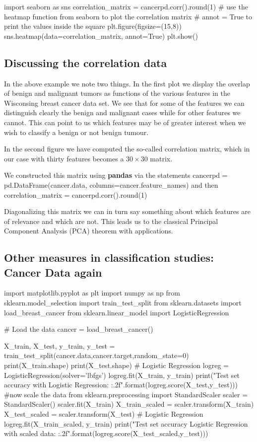 \documentclass[%
oneside,                 %
final,                   %
10pt]{article}
\begin{document}
import seaborn as sns
correlation_matrix = cancerpd.corr().round(1)
# use the heatmap function from seaborn to plot the correlation matrix
# annot = True to print the values inside the square
plt.figure(figsize=(15,8))
sns.heatmap(data=correlation_matrix, annot=True)
plt.show()


\epycod

\subsection{Discussing the correlation data}

In the above example we note two things. In the first plot we display
the overlap of benign and malignant tumors as functions of the various
features in the Wisconsing breast cancer data set. We see that for
some of the features we can distinguish clearly the benign and
malignant cases while for other features we cannot. This can point to
us which features may be of greater interest when we wish to classify
a benign or not benign tumour.

In the second figure we have computed the so-called correlation
matrix, which in our case with thirty features becomes a $30\times 30$
matrix.

We constructed this matrix using \textbf{pandas} via the statements
\bpycod
cancerpd = pd.DataFrame(cancer.data, columns=cancer.feature_names)
\epycod
and then
\bpycod
correlation_matrix = cancerpd.corr().round(1)
\epycod

Diagonalizing this matrix we can in turn say something about which
features are of relevance and which are not. This leads  us to
the classical Principal Component Analysis (PCA) theorem with
applications. 



\subsection{Other measures in classification studies: Cancer Data  again}
\bpycod
import matplotlib.pyplot as plt
import numpy as np
from sklearn.model_selection import  train_test_split 
from sklearn.datasets import load_breast_cancer
from sklearn.linear_model import LogisticRegression

# Load the data
cancer = load_breast_cancer()

X_train, X_test, y_train, y_test = train_test_split(cancer.data,cancer.target,random_state=0)
print(X_train.shape)
print(X_test.shape)
# Logistic Regression
logreg = LogisticRegression(solver='lbfgs')
logreg.fit(X_train, y_train)
print("Test set accuracy with Logistic Regression: {:.2f}".format(logreg.score(X_test,y_test)))
#now scale the data
from sklearn.preprocessing import StandardScaler
scaler = StandardScaler()
scaler.fit(X_train)
X_train_scaled = scaler.transform(X_train)
X_test_scaled = scaler.transform(X_test)
# Logistic Regression
logreg.fit(X_train_scaled, y_train)
print("Test set accuracy Logistic Regression with scaled data: {:.2f}".format(logreg.score(X_test_scaled,y_test)))
\end{document}
